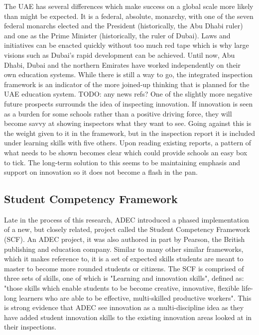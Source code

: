 The UAE has several differences which make success on a global scale more likely than might be expected. It is a federal, absolute, monarchy, with one of the seven federal monarchs elected and the President (historically, the Abu Dhabi ruler) and one as the Prime Minister (historically, the ruler of Dubai). Laws and initiatives can be enacted quickly without too much red tape which is why large visions such as Dubai’s rapid development can be achieved.
Until now, Abu Dhabi, Dubai and the northern Emirates have worked independently on their own education systems. While there is still a way to go, the integrated inspection framework is an indicator of the more joined-up thinking that is planned for the UAE education system. TODO: any news refs?
One of the slightly more negative future prospects surrounds the idea of inspecting innovation. If innovation is seen as a burden for some schools rather than a positive driving force, they will become savvy at showing inspectors what they want to see. 
Going against this is the weight given to it in the framework, but in the inspection report it is included under learning skills with five others. Upon reading existing reports, a pattern of what needs to be shown becomes clear which could provide schools an easy box to tick. The long-term solution to this seems to be maintaining emphasis and support on innovation so it does not become a flash in the pan. 

\subsection{Student Competency Framework}

Late in the process of this research, ADEC introduced a phased implementation of a new, but closely related, project called the Student Competency Framework (SCF). An ADEC project, it was also authored in part by Pearson, the British publishing and education company. Similar to many other similar frameworks, which it makes reference to, it is a set of expected skills students are meant to master to become more rounded students or citizens. The SCF is comprised of three sets of skills, one of which is "Learning and innovation skills", defined as: "those skills which enable students to be become creative, innovative, flexible life-long learners who are able to be effective, multi-skilled productive workers". This is strong evidence that ADEC see innovation as a multi-discipline idea as they have added student innovation skills to the existing innovation areas looked at in their inspections.

